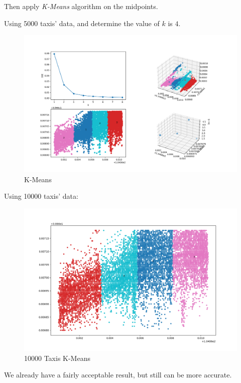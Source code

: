 \documentclass[fontset=none]{ctexart}
\theoremstyle{definition}
\theoremstyle{remark}
\begin{document}
Then apply \textit{K-Means} algorithm on the midpoints.

Using 5000 taxis' data, and determine the value of $k$ is $4$.
\begin{figure}[htb]
  \centering
  \includegraphics[width=\textwidth]{images/5000辆车kmeans.png}
  \caption{K-Means}
  \label{fig: 5000}
\end{figure}

\clearpage
Using 10000 taxis' data:
\begin{figure}[htb]
  \centering
  \includegraphics[width=\textwidth]{images/10000辆车kmeans.png}
  \caption{10000 Taxis K-Means}
  \label{fig: 10000}
\end{figure}

We already have a fairly acceptable result, but still can be more accurate.
\end{document}

